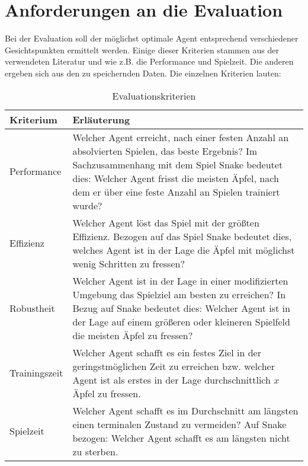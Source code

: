 \section{Anforderungen an die Evaluation} \label{sec:Anforderungen_an_die_Evaluation}
Bei der Evaluation soll der möglichst optimale Agent entsprechend verschiedener Gesichtspunkten ermittelt werden.
Einige dieser Kriterien stammen aus der verwendeten Literatur \cite{Autonomous_Agents_in_Snake_Game_via_DRL} und \cite{UAV} wie z.B. die Performance und Spielzeit. Die anderen ergeben sich aus den zu speichernden Daten.
Die einzelnen Kriterien lauten:
\begin{longtable}[h]{|p{4cm}|p{\linewidth - 5cm}|}
	\caption{Evaluationskriterien}
	\label{tab:Kriterien} 
	\endfirsthead
	\endhead
	\hline
	Kriterium & Erläuterung \\
	\hline
	Performance & Welcher Agent erreicht, nach einer festen Anzahl an absolvierten Spielen, das beste Ergebnis? Im Sachzusammenhang mit dem Spiel Snake bedeutet dies: Welcher Agent frisst die meisten Äpfel, nach dem er über eine feste Anzahl an Spielen trainiert wurde? \\
	\hline
	Effizienz & Welcher Agent löst das Spiel mit der größten Effizienz. Bezogen auf das Spiel Snake bedeutet dies, welches Agent ist in der Lage die Äpfel mit möglichst wenig Schritten zu fressen? \\
	\hline
	Robustheit & Welcher Agent ist in der Lage in einer modifizierten Umgebung das Spielziel am besten zu erreichen? In Bezug auf Snake bedeutet dies: Welcher Agent ist in der Lage auf einem größeren oder kleineren Spielfeld die meisten Äpfel zu fressen? \\
	\hline
	Trainingszeit & Welcher Agent schafft es ein festes Ziel in der geringstmöglichen Zeit zu erreichen bzw. welcher Agent ist als erstes in der Lage durchschnittlich $x$ Äpfel zu fressen. \\
	\hline
	Spielzeit & Welcher Agent schafft es im Durchschnitt am längsten einen terminalen Zustand zu vermeiden? Auf Snake bezogen: Welcher Agent schafft es am längsten nicht zu sterben. \\
	\hline
\end{longtable}